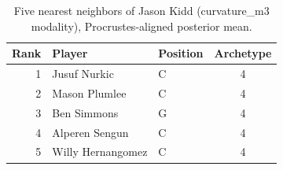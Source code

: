 \begin{table}[htbp]
  \centering\small
  \begin{tabular}{rllc}
    \toprule
    Rank & Player & Position & Archetype \\
    \midrule
    1 & Jusuf Nurkic & C & 4 \\
    2 & Mason Plumlee & C & 4 \\
    3 & Ben Simmons & G & 4 \\
    4 & Alperen Sengun & C & 4 \\
    5 & Willy Hernangomez & C & 4 \\
    \bottomrule
  \end{tabular}
  \caption{Five nearest neighbors of Jason Kidd (curvature_m3 modality), Procrustes-aligned posterior mean.}
  \label{tab:Jason_Kidd_neighbors_curvature_m3}
\end{table}

